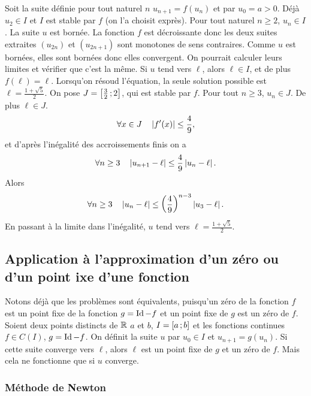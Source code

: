 Soit la suite définie pour tout naturel $n$ $u_{n+1}=f(u_n)$ et par $u_0 = a>0$. Déjà $u_2 \in I$ et $I$ est stable par $f$ (on l'a choisit exprès). Pour tout naturel $n \geq 2$, $u_n \in I$. La suite $u$ est bornée. La fonction $f$ est décroissante donc les deux suites extraites $(u_{2n})$ et $(u_{2n+1})$ sont monotones de sens contraires. Comme $u$ est bornées, elles sont bornées donc elles convergent. On pourrait calculer leurs limites et vérifier que c'est la même. Si $u$ tend vers $\ell$, alors $\ell \in I$, et de plus $f(\ell)=\ell$. Lorsqu'on résoud l'équation, la seule solution possible est $\ell=\frac{1+\sqrt{5}}{2}$. On pose $J=\left[ \frac{3}{2} \, ;  2 \right]$, qui est stable par $f$. Pour tout $n \geq 3$, $u_n \in J$. De plus $\ell \in J$.
\begin{equation}
  \forall x \in J \quad \left\lvert f'(x)\right\rvert\leq \frac{4}{9},
\end{equation}
et d'après l'inégalité des accroissements finis on a
\begin{equation}
 \forall n \geq 3 \quad \left\lvert u_{n+1}-\ell\right\rvert  \leq \frac{4}{9} \left\lvert u_n-\ell\right\rvert.
\end{equation}
Alors
\begin{equation}
  \forall n \geq 3 \quad \left\lvert u_n-\ell\right\rvert \leq \left(\frac{4}{9}\right)^{n-3}\left\lvert u_3-\ell\right\rvert.
\end{equation}
En passant à la limite dans l'inégalité, $u$ tend vers $\ell=\frac{1+\sqrt{5}}{2}$.

\subsection{Application à l'approximation d'un zéro ou d'un point ixe d'une fonction}

Notons déjà que les problèmes sont équivalents, puisqu'un zéro de la fonction $f$ est un point fixe de la fonction $g=\operatorname{Id}-f$ et un point fixe de $g$ est un zéro de $f$. Soient deux points distincts de $\mathbb{R}$ $a$ et $b$, $I=\left[ a \, ;  b \right]$ et les fonctions continues $f \in \mathit{C}(I)$, $g=\operatorname{Id} - f$. On définit la suite $u$ par $u_0 \in I$ et $u_{n+1}=g(u_n)$. Si cette suite converge vers $\ell$, alors $\ell$ est un point fixe de $g$ et un zéro de $f$. Mais cela ne fonctionne que si $u$ converge.

\subsubsection{Méthode de Newton}

